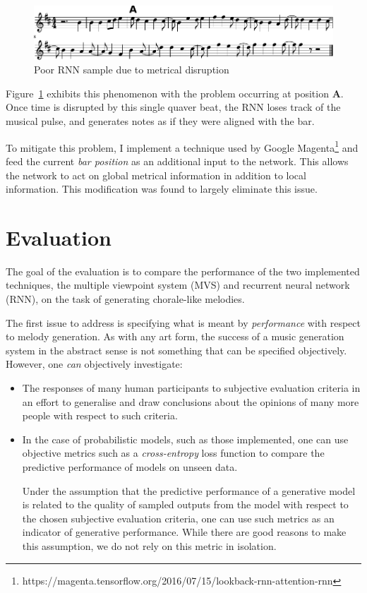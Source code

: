 \documentclass[12pt,a4paper,twoside,openright]{report}
\begin{document}
\begin{figure}[H]
\centering
\includegraphics[width=0.9\linewidth]{figs/rnn_likes_syncopation.pdf}
\caption{Poor RNN sample due to metrical disruption}
\label{fig:rnn-instability}
\end{figure}

Figure~\ref{fig:rnn-instability} exhibits this phenomenon with the problem
occurring at position \textbf{A}. Once time is disrupted by this single quaver
beat, the RNN loses track of the musical pulse, and generates notes as if they
were aligned with the bar.

To mitigate this problem, I implement a technique used by Google
Magenta\footnote{https://magenta.tensorflow.org/2016/07/15/lookback-rnn-attention-rnn}
and feed the current \emph{bar position} as an additional input to the network.
This allows the network to act on global metrical information in addition to
local information. This modification was found to largely eliminate this issue.

\chapter{Evaluation}\label{chap:eval}

The goal of the evaluation is to compare the performance of the two implemented
techniques, the multiple viewpoint system (MVS) and recurrent neural network
(RNN), on the task of generating chorale-like melodies.

The first issue to address is specifying what is meant by \emph{performance}
with respect to melody generation. As with any art form, the success of a music
generation system in the abstract sense is not something that can be specified
objectively. However, one \emph{can} objectively investigate:
\begin{itemize}
  \item The responses of many human participants to subjective evaluation
    criteria in an effort to generalise and draw conclusions about the opinions
    of many more people with respect to such criteria.  
  \item In the case of probabilistic models, such as those implemented, one can
    use objective metrics such as a \emph{cross-entropy} loss function to
    compare the predictive performance of models on unseen data. 

    Under the assumption that the predictive performance of a generative model
    is related to the quality of sampled outputs from the model with respect to
    the chosen subjective evaluation criteria, one can use such metrics as an
    indicator of generative performance. While there are good reasons to make
    this assumption, we do not rely on this metric in isolation.
\end{itemize}
\end{document}
